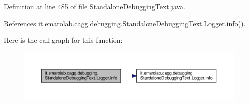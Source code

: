 Definition at line 485 of file Standalone\-Debugging\-Text.\-java.



References it.\-emarolab.\-cagg.\-debugging.\-Standalone\-Debugging\-Text.\-Logger.\-info().



Here is the call graph for this function\-:
\nopagebreak
\begin{figure}[H]
\begin{center}
\leavevmode
\includegraphics[width=350pt]{classit_1_1emarolab_1_1cagg_1_1debugging_1_1StandaloneDebuggingText_1_1Logger_a331e571ed950b07fc00cdf5cd2da43af_cgraph}
\end{center}
\end{figure}


